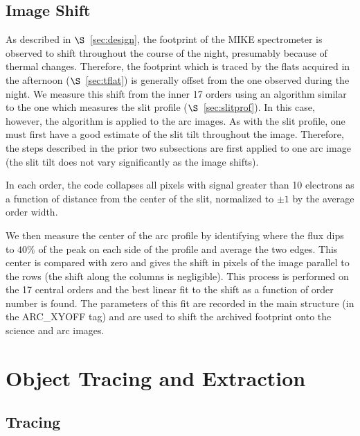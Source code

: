 \documentclass[12pt,preprint]{aastex}
\begin{document}
\subsection{Image Shift}
\label{sec:shift}

As described in $\S$~\ref{sec:design}, the footprint of the
MIKE spectrometer is observed to shift throughout the course
of the night, presumably because of thermal changes. 
Therefore, the footprint which is traced by the
flats acquired in the afternoon ($\S$~\ref{sec:tflat})
is generally offset from the one observed during the night.
We measure this shift from the inner 17 orders using
an algorithm similar to the one which measures the slit
profile ($\S$~\ref{sec:slitprof}).  In this case, however,
the algorithm is applied to the arc images.  As with the slit
profile, one must first have a good estimate of the slit
tilt throughout the image.  Therefore, the steps described in
the prior two subsections are first applied to one arc image
(the slit tilt does not vary significantly as the image shifts).

In each order,  the code collapses all pixels
with signal greater than 10 electrons as a function of 
distance from the center of the slit, normalized to
$\pm 1$ by the average order width.  

We then measure the
center of the arc profile by identifying where the flux
dips to $40\%$ of the peak on each side of the profile
and average the two edges.  This center is compared with
zero and gives the shift in pixels of the image parallel
to the rows (the shift along the columns is negligible).
This process is performed on the 17 central orders and the best
linear fit to the shift as a function of order number is found.  
The parameters of this fit are recorded in the main structure 
(in the ARC\_XYOFF tag) and are
used to shift the archived footprint onto the science and
arc images.

%

 
\section{Object Tracing and Extraction}
\label{sec:object}

\subsection{Tracing}
\end{document}
